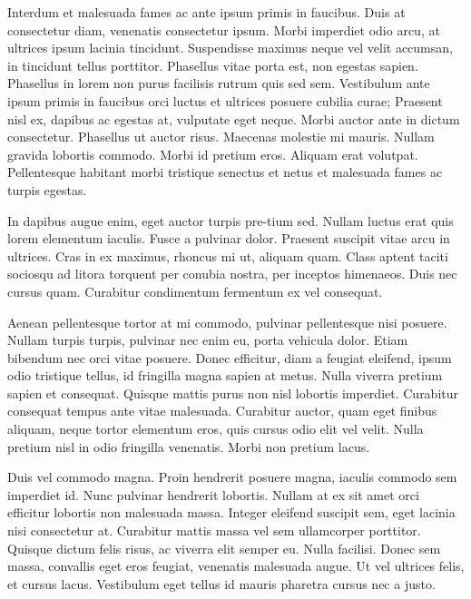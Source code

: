 Interdum et malesuada fames ac ante ipsum primis in faucibus. Duis at consectetur diam, venenatis consectetur ipsum. Morbi imperdiet odio arcu, at ultrices ipsum lacinia tincidunt. Suspendisse maximus neque vel velit accumsan, in tincidunt tellus porttitor. Phasellus vitae porta est, non egestas sapien. Phasellus in lorem non purus facilisis rutrum quis sed sem. Vestibulum ante ipsum primis in faucibus orci luctus et ultrices posuere cubilia curae; Praesent nisl ex, dapibus ac egestas at, vulputate eget neque. Morbi auctor ante in dictum consectetur. Phasellus ut auctor risus. Maecenas molestie mi mauris. Nullam gravida lobortis commodo. Morbi id pretium eros. Aliquam erat volutpat. Pellentesque habitant morbi tristique senectus et netus et malesuada fames ac turpis egestas.

In dapibus augue enim, eget auctor turpis pre-tium sed. Nullam luctus erat quis lorem elementum iaculis. Fusce a pulvinar dolor. Praesent suscipit vitae arcu in ultrices. Cras in ex maximus, rhoncus mi ut, aliquam quam. Class aptent taciti sociosqu ad litora torquent per conubia nostra, per inceptos himenaeos. Duis nec cursus quam. Curabitur condimentum fermentum ex vel consequat.

Aenean pellentesque tortor at mi commodo, pulvinar pellen\-tesque nisi posuere. Nullam turpis turpis, pulvinar nec enim eu, porta vehicula dolor. Etiam bibendum nec orci vitae posuere. Donec efficitur, diam a feugiat eleifend, ipsum odio tristique tellus, id fringilla magna sapien at metus. Nulla viverra pretium sapien et consequat. Quisque mattis purus non nisl lobortis imperdiet. Curabitur consequat tempus ante vitae malesuada. Curabitur auctor, quam eget finibus aliquam, neque tortor elementum eros, quis cursus odio elit vel velit. Nulla pretium nisl in odio fringilla venenatis. Morbi non pretium lacus.

Duis vel commodo magna. Proin hendrerit posuere magna, iaculis commodo sem imperdiet id. Nunc pulvinar hendrerit lobortis. Nullam at ex sit amet orci efficitur lobortis non malesuada massa. Integer eleifend suscipit sem, eget lacinia nisi consectetur at. Curabitur mattis massa vel sem ullamcorper porttitor. Quisque dictum felis risus, ac viverra elit semper eu. Nulla facilisi. Donec sem massa, convallis eget eros feugiat, venenatis malesuada augue. Ut vel ultrices felis, et cursus lacus. Vestibulum eget tellus id mauris pharetra cursus nec a justo.

